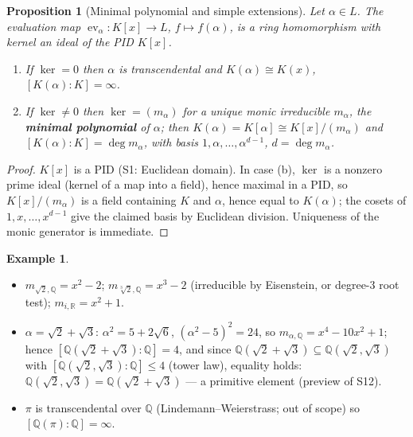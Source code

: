 \documentclass[11pt,a4paper]{article}
\newtheorem{proposition}[theorem]{Proposition}
\theoremstyle{definition}
\newtheorem{example}[theorem]{Example}
\newcommand{\Q}{\mathbb{Q}}
\newcommand{\R}{\mathbb{R}}
\begin{document}
\begin{proposition}[Minimal polynomial and simple extensions]\label{prop:minpoly}
Let $\alpha\in L$. The evaluation map $\operatorname{ev}_\alpha:K[x]\to L$, $f\mapsto f(\alpha)$, is a
ring homomorphism with kernel an ideal of the PID $K[x]$.
\begin{enumerate}[label=(\alph*)]
  \item If $\ker=0$ then $\alpha$ is transcendental and $K(\alpha)\cong K(x)$, $[K(\alpha):K]=\infty$.
  \item If $\ker\neq0$ then $\ker=(m_\alpha)$ for a unique monic irreducible $m_\alpha$, the
    \textbf{minimal polynomial} of $\alpha$; then $K(\alpha)=K[\alpha]\cong K[x]/(m_\alpha)$ and
    $[K(\alpha):K]=\deg m_\alpha$, with basis $1,\alpha,\dots,\alpha^{d-1}$, $d=\deg m_\alpha$.
\end{enumerate}
\end{proposition}
\begin{proof}
$K[x]$ is a PID (S1: Euclidean domain). In case (b), $\ker$ is a nonzero prime ideal (kernel of a
map into a field), hence maximal in a PID, so $K[x]/(m_\alpha)$ is a field containing $K$ and
$\alpha$, hence equal to $K(\alpha)$; the cosets of $1,x,\dots,x^{d-1}$ give the claimed basis by
Euclidean division. Uniqueness of the monic generator is immediate.
\end{proof}

\begin{example}\label{ex:minpoly}
\begin{itemize}
  \item $m_{\sqrt2,\Q}=x^2-2$; $m_{\sqrt[3]{2},\Q}=x^3-2$ (irreducible by Eisenstein, or degree-3
    root test); $m_{i,\R}=x^2+1$.
  \item $\alpha=\sqrt2+\sqrt3$: $\alpha^2=5+2\sqrt6$, $(\alpha^2-5)^2=24$, so
    $m_{\alpha,\Q}=x^4-10x^2+1$; hence $[\Q(\sqrt2+\sqrt3):\Q]=4$, and since
    $\Q(\sqrt2+\sqrt3)\subseteq\Q(\sqrt2,\sqrt3)$ with $[\Q(\sqrt2,\sqrt3):\Q]\le4$ (tower law),
    equality holds: $\Q(\sqrt2,\sqrt3)=\Q(\sqrt2+\sqrt3)$ --- a primitive element (preview of S12).
  \item $\pi$ is transcendental over $\Q$ (Lindemann--Weierstrass; out of scope) so
    $[\Q(\pi):\Q]=\infty$.
\end{itemize}
\end{example}
\end{document}

